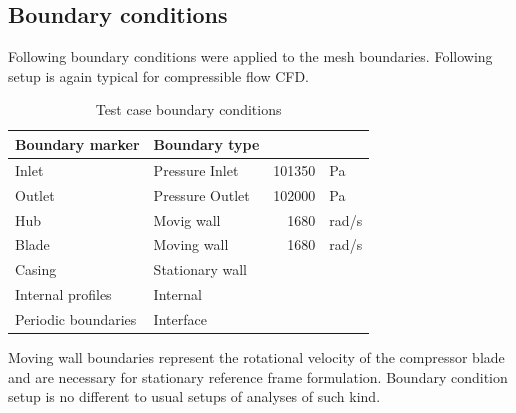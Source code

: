 \subsection{Boundary conditions} \label{casebc}
Following boundary conditions were applied to the mesh boundaries. Following setup is again typical for compressible flow CFD.

\begin{table}[htb!]
\centering
\caption{Test case boundary conditions} \label{tab:testbcs}
\begin{tabular}{ | l | l | r l | } \hline
Boundary marker & Boundary type & & \\ \hline \hline
Inlet & Pressure Inlet & 101350  & Pa\\ \hline
Outlet & Pressure Outlet & 102000 & Pa \\ \hline
Hub & Movig wall & 1680 & rad/s \\ \hline
Blade & Moving wall & 1680 & rad/s \\ \hline
Casing & Stationary wall & &  \\ \hline
Internal profiles & Internal & & \\ \hline
Periodic boundaries & Interface & & \\ \hline 
\end{tabular}
\end{table}

Moving wall boundaries represent the rotational velocity of the compressor blade and are necessary for stationary reference frame formulation. Boundary condition setup is no different to usual setups of analyses of such kind.


